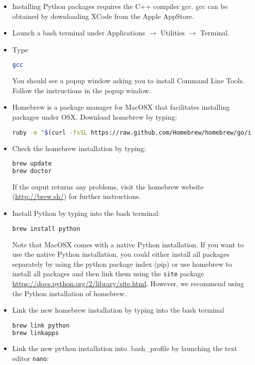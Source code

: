 \documentclass[a4paper,11pt]{article}
\begin{document}
\begin{itemize}
 \item Installing Python packages requires the C++ compiler gcc. gcc can be obtained by downloading XCode from the Apple AppStore.
 \item Launch a bash terminal under Applications $\rightarrow$ Utilities $\rightarrow$ Terminal.
 \item Type
 \begin{lstlisting}[frame=single,language=bash]  
gcc
\end{lstlisting}
You should see a popup window asking you to install Command Line Tools. Follow the instructions in the popup window.
\item Homebrew is a package manager for MacOSX that facilitates installing packages under OSX. Download homebrew by typing:
\begin{lstlisting}[frame=single,language=bash]  
ruby -e "$(curl -fsSL https://raw.github.com/Homebrew/homebrew/go/install)"
\end{lstlisting}
\item Check the homebrew installation by typing: 
\begin{lstlisting}[frame=single,language=bash]  
brew update
brew doctor
\end{lstlisting}
If the ouput returns any problems, visit the homebrew website (\url{http://brew.sh/}) for further instructions.
\item Install Python by typing into the bash terminal:
\begin{lstlisting}[frame=single,language=bash]  
brew install python
\end{lstlisting}
Note that MacOSX comes with a native Python installation. If you want to use the native Python installation, you could either install all packages 
separately by using the python package index (pip) or use homebrew to install all packages and then link them using the \verb+site+ package \url{https://docs.python.org/2/library/site.html}. 
However, we recommend using the Python installation of homebrew. 
\item Link the new homebrew installation by typing into the bash terminal
\begin{lstlisting}[frame=single,language=bash]  
brew link python
brew linkapps
\end{lstlisting}
\item Link the new python installation into .bash\_profile by launching the text editor \verb+nano+: 
\begin{lstlisting}[frame=single,language=bash]  

\end{lstlisting}
\end{itemize}
\end{document}
